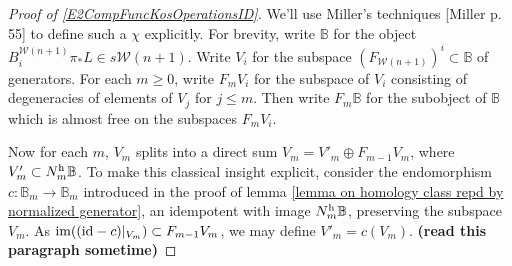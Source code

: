 \documentclass[11pt]{amsart}
\theoremstyle{plain}
\theoremstyle{definition}
\DeclareMathOperator{\im}{im}
\renewcommand{\to}{\longrightarrow}
\newcommand{\calW}{\mathcal{W}}
\theoremstyle{plain}
\newcommand{\Id}{\textup{id}}
\begin{document}
\begin{Composite functor spectral sequences}
\begin{tricky proofs of operation compatibilities}
\begin{proof}[Proof of \ref{E2CompFuncKosOperationsID}]
We'll use Miller's techniques [Miller p. 55] to define such a $\chi$ explicitly. For brevity, write $\mathbb{B}$ for the object $B_i^{\calW(n+1)}\pi_*L\in s\calW(n+1)$. Write $V_i$ for the subspace $(F_{\calW(n+1)})^{i}\subset \mathbb{B}$ of generators. For each $m\geq0$, write $F_mV_i$ for the subspace of $V_i$ consisting of degeneracies of elements of $V_j$ for $j\leq m$. Then write $F_m\mathbb{B}$ for the subobject of $\mathbb{B}$ which is almost free on the subspaces $F_mV_i$.

Now for each $m$, $V_m$ splits into a direct sum
$V_m=V'_m\oplus F_{m-1}V_m$,
where $V'_m\subset N_m^\textup{h}\mathbb{B}$. To make this classical insight explicit, consider the endomorphism $c:\mathbb{B}_m\to \mathbb{B}_m$ introduced in the proof of lemma \ref{lemma on homology class repd by normalized generator}, an idempotent with image $N_m^\textup{h}\mathbb{B}$, preserving the subspace $V_m$. As $\im((\Id-c)|_{V_m})\subset F_{m-1}V_m$, we may define $V'_m=c(V_m)$. \textbf{(read this paragraph sometime)}


\end{proof}
\end{tricky proofs of operation compatibilities}
\end{Composite functor spectral sequences}
\end{document}
